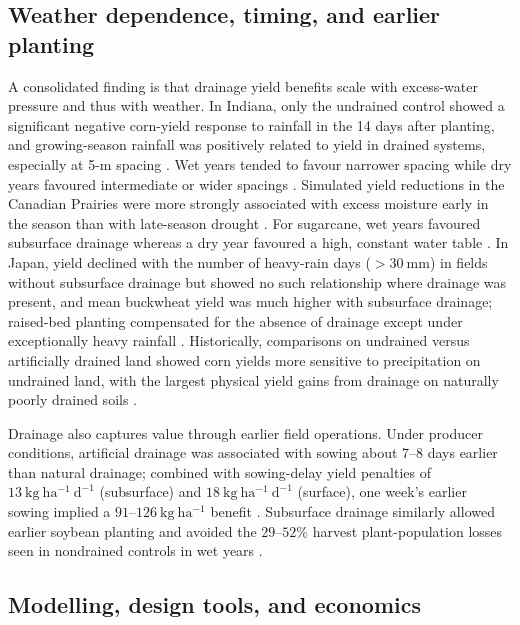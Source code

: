 \subsection{Weather dependence, timing, and earlier planting}

A consolidated finding is that drainage yield benefits scale with excess-water pressure and thus with weather. In Indiana, only the undrained control showed a significant negative corn-yield response to rainfall in the 14 days after planting, and growing-season rainfall was positively related to yield in drained systems, especially at 5-m spacing \parencite{Rui2024}. Wet years tended to favour narrower spacing while dry years favoured intermediate or wider spacings \parencite{Kladivko2005,Acharya2019}. Simulated yield reductions in the Canadian Prairies were more strongly associated with excess moisture early in the season than with late-season drought \parencite{Cordeiro2015}. For sugarcane, wet years favoured subsurface drainage whereas a dry year favoured a high, constant water table \parencite{CAMP1982}. In Japan, yield declined with the number of heavy-rain days (\(>30\ \mathrm{mm}\)) in fields without subsurface drainage but showed no such relationship where drainage was present, and mean buckwheat yield was much higher with subsurface drainage; raised-bed planting compensated for the absence of drainage except under exceptionally heavy rainfall \parencite{Takeshima2023}. Historically, comparisons on undrained versus artificially drained land showed corn yields more sensitive to precipitation on undrained land, with the largest physical yield gains from drainage on naturally poorly drained soils \parencite{JORJANI1991}.

Drainage also captures value through earlier field operations. Under producer conditions, artificial drainage was associated with sowing about 7--8 days earlier than natural drainage; combined with sowing-delay yield penalties of \(13\ \mathrm{kg\ ha^{-1}\ d^{-1}}\) (subsurface) and \(18\ \mathrm{kg\ ha^{-1}\ d^{-1}}\) (surface), one week's earlier sowing implied a \(91\textrm{--}126\ \mathrm{kg\ ha^{-1}}\) benefit \parencite{Mourtzinis2021}. Subsurface drainage similarly allowed earlier soybean planting and avoided the \(29\textrm{--}52\%\) harvest plant-population losses seen in nondrained controls in wet years \parencite{Nelson2011}.

\subsection{Modelling, design tools, and economics}

